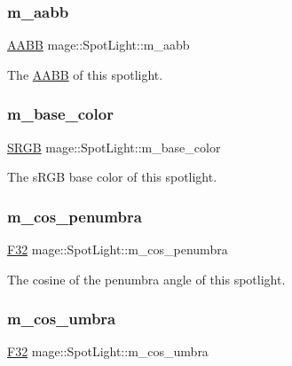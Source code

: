 \subsubsection{\texorpdfstring{m\+\_\+aabb}{m\_aabb}}
{\footnotesize\ttfamily \hyperlink{classmage_1_1_a_a_b_b}{A\+A\+BB} mage\+::\+Spot\+Light\+::m\+\_\+aabb\hspace{0.3cm}{\ttfamily [private]}}

The \hyperlink{classmage_1_1_a_a_b_b}{A\+A\+BB} of this spotlight. \hypertarget{classmage_1_1_spot_light_af61462cf792ad5c713af8d849fa17309}{}\label{classmage_1_1_spot_light_af61462cf792ad5c713af8d849fa17309} 
\subsubsection{\texorpdfstring{m\+\_\+base\+\_\+color}{m\_base\_color}}
{\footnotesize\ttfamily \hyperlink{structmage_1_1_s_r_g_b}{S\+R\+GB} mage\+::\+Spot\+Light\+::m\+\_\+base\+\_\+color\hspace{0.3cm}{\ttfamily [private]}}

The s\+R\+GB base color of this spotlight. \hypertarget{classmage_1_1_spot_light_ac4448bbc1c8a924141d2798c3365047a}{}\label{classmage_1_1_spot_light_ac4448bbc1c8a924141d2798c3365047a} 
\subsubsection{\texorpdfstring{m\+\_\+cos\+\_\+penumbra}{m\_cos\_penumbra}}
{\footnotesize\ttfamily \hyperlink{namespacemage_aa97e833b45f06d60a0a9c4fc22ae02c0}{F32} mage\+::\+Spot\+Light\+::m\+\_\+cos\+\_\+penumbra\hspace{0.3cm}{\ttfamily [private]}}

The cosine of the penumbra angle of this spotlight. \hypertarget{classmage_1_1_spot_light_aa2ec430d0f95d082112260b5d9640d50}{}\label{classmage_1_1_spot_light_aa2ec430d0f95d082112260b5d9640d50} 
\subsubsection{\texorpdfstring{m\+\_\+cos\+\_\+umbra}{m\_cos\_umbra}}
{\footnotesize\ttfamily \hyperlink{namespacemage_aa97e833b45f06d60a0a9c4fc22ae02c0}{F32} mage\+::\+Spot\+Light\+::m\+\_\+cos\+\_\+umbra\hspace{0.3cm}{\ttfamily [private]}}

